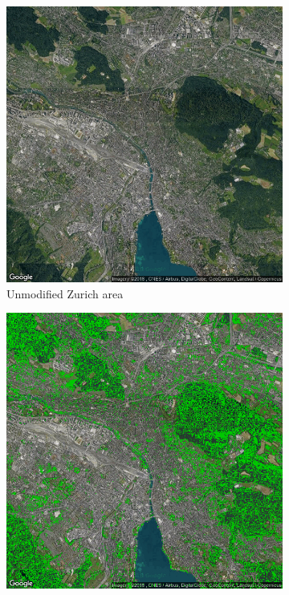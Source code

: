 \documentclass[letterpaper]{article}
\begin{document}
\begin{figure}[htb]
    \begin{subfigure}[t]{.48\columnwidth}
        \centering
        \includegraphics[width=\linewidth]{images/greenery/Zurich.png}
        \caption[width=.9\linewidth]{Unmodified Zurich area}
    \end{subfigure}\hspace{0.03\columnwidth}
    \begin{subfigure}[t]{.48\columnwidth}
        \centering
        \includegraphics[width=\linewidth]{images/greenery/Zurich_greenery.png}

\end{subfigure}
\end{figure}
\end{document}

